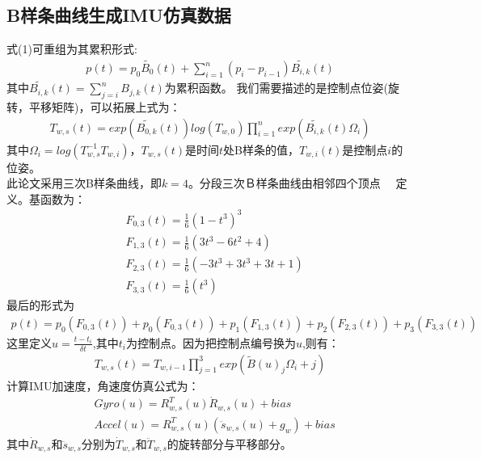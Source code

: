 \documentclass[UTF8]{ctexart}
\begin{document}
\subsection{B样条曲线生成IMU仿真数据}
\indent 式(1)可重组为其累积形式:
\begin{equation}
\begin{aligned}
p(t)=p_0\tilde{B_0}(t)+\sum_{i=1}^n(p_i-p_{i-1})\tilde{B_{i,k}}(t)
\end{aligned}
\end{equation}
\indent 其中$\tilde{B_{i,k}}(t)=\sum_{j=i}^nB_{j,k}(t)$为累积函数。
\indent 我们需要描述的是控制点位姿(旋转，平移矩阵)，可以拓展上式为：
\begin{equation}
\begin{aligned}
T_{w,s}(t)=exp(\tilde{B_{0,k}}(t))log(T_{w,0})\prod_{i=1}^nexp(\tilde{B_{i,k}}(t)\Omega_i)
\end{aligned}
\end{equation}
\indent 其中$\Omega_i=log(T_{w,s}^{-1}T_{w,i})$，$T_{w,s}(t)$是时间$t$处B样条的值，$T_{w,i}(t)$是控制点$i$的位姿。\\
\indent 此论文采用三次B样条曲线，即$k=4$。分段三次Ｂ样条曲线由相邻四个顶点
　定义。基函数为：\\
\begin{equation}
\begin{aligned}
&F_{0,3}(t)=\frac{1}{6}(1-t^3)^3\\
&F_{1,3}(t)=\frac{1}{6}(3t^3-6t^2+4)\\
&F_{2,3}(t)=\frac{1}{6}(-3t^3+3t^3+3t+1)\\
&F_{3,3}(t)=\frac{1}{6}(t^3)
\end{aligned}
\end{equation}
\indent 最后的形式为\\
\begin{equation}
\begin{aligned}
p(t)=p_0(F_{0,3}(t))+p_0(F_{0,3}(t))+p_1(F_{1,3}(t))+p_2(F_{2,3}(t))+p_3(F_{3,3}(t))
\end{aligned}
\end{equation}
\indent 这里定义$u=\frac{t-t_i}{\delta t}$,其中$t_i$为控制点。因为把控制点编号换为$u$,则有：\\
\begin{equation}
\begin{aligned}
T_{w,s}(t)=T_{w,i-1}\prod^3_{j=1}exp(\tilde{B}(u)_j\Omega_i+j)
\end{aligned}
\end{equation}
\indent 计算IMU加速度，角速度仿真公式为：\\
\begin{equation}
\begin{aligned}
&Gyro(u)=R_{w,s}^T(u)\dot{R}_{w,s}(u)+bias\\
&Accel(u)=R_{w,s}^T(u)(\ddot{s}_{w,s}(u)+g_w)+bias
\end{aligned}
\end{equation}
\indent 其中$\dot{R}_{w,s}$和$\ddot{s}_{w,s}$分别为$\dot{T}_{w,s}$和$\ddot{T}_{w,s}$的旋转部分与平移部分。\\
\end{document}
